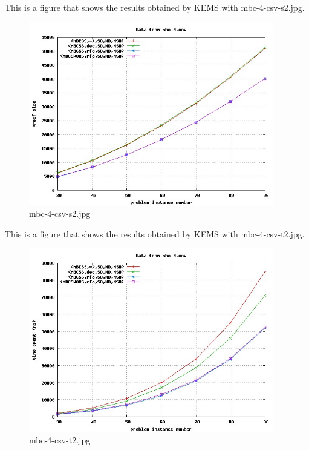 This is a figure that shows the results obtained by KEMS with mbc-4-csv-s2.jpg.
\begin{figure}[htbp]
\begin{center}
\includegraphics[width=0.95\textwidth]{figuras/mbc-4-csv-s2.jpg}
\end{center}
\caption{mbc-4-csv-s2.jpg}
\end{figure}

This is a figure that shows the results obtained by KEMS with mbc-4-csv-t2.jpg.
\begin{figure}[htbp]
\begin{center}
\includegraphics[width=0.95\textwidth]{figuras/mbc-4-csv-t2.jpg}
\end{center}
\caption{mbc-4-csv-t2.jpg}
\end{figure}

